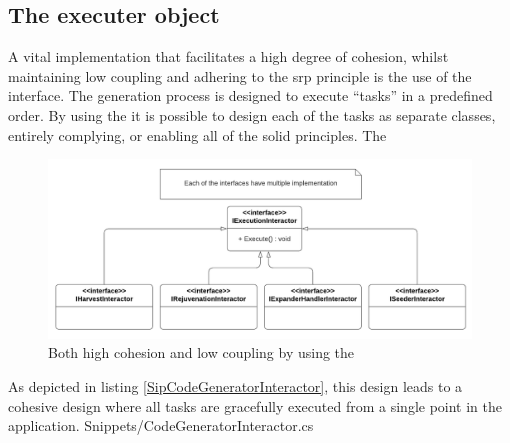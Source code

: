 \subsection{The executer object} \label{subsec:IExecutionInteractorObject}

A vital implementation that facilitates a high degree of cohesion, whilst maintaining
low coupling and adhering to the \gls{srp} principle is the use of the
 interface. The generation process is designed to
execute \enquote{tasks} in a predefined order. By using the
 it is possible to design each of the tasks as
separate classes, entirely complying, or enabling all of the \gls{solid} principles. The 

\begin{figure}[H]
    \centering
    \includegraphics[width=1\textwidth]{Figures/class_diagram_iexecutioninteractor.pdf}
    \caption[Plugin Archticture]{Both high cohesion and low coupling by using the }
    \label{fig:iexecutioninteractor}
  \end{figure}


As depicted in listing \ref{SipCodeGeneratorInteractor}, this design leads to a cohesive
design where all tasks are gracefully executed from a single point in the application.
 {Snippets/CodeGeneratorInteractor.cs}